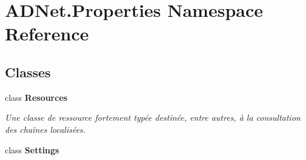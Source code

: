 \hypertarget{namespace_a_d_net_1_1_properties}{}\section{A\+D\+Net.\+Properties Namespace Reference}
\label{namespace_a_d_net_1_1_properties}
\subsection*{Classes}
\begin{DoxyCompactItemize}
\item 
class {\bfseries Resources}
\begin{DoxyCompactList}\small\item\em Une classe de ressource fortement typée destinée, entre autres, à la consultation des chaînes localisées. \end{DoxyCompactList}\item 
class {\bfseries Settings}
\end{DoxyCompactItemize}
